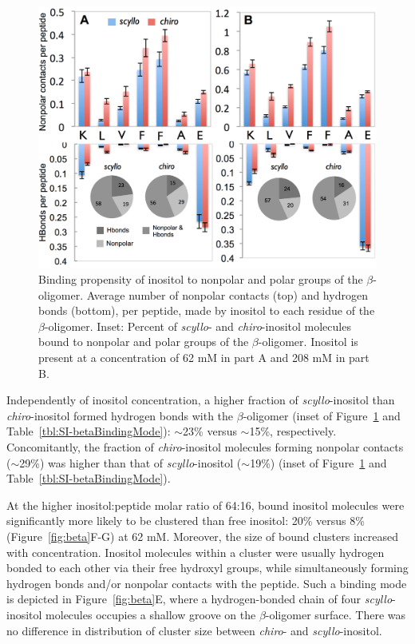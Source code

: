 \begin{figure}
\includegraphics[width=15cm]{figures/results2/inos2_figures_beta_residues_revised.pdf}
\caption[Binding propensity of inositol to nonpolar and polar groups of the $\beta$-oligomer]{Binding propensity of inositol to nonpolar and polar groups of the $\beta$-oligomer. Average number of nonpolar contacts (top) and hydrogen bonds (bottom), per peptide, made by inositol to each residue of the $\beta$-oligomer. Inset: Percent of \emph{scyllo}- and \emph{chiro}-inositol molecules bound to nonpolar and polar groups of the $\beta$-oligomer.  Inositol is present at a concentration of 62 mM in part A and 208 mM in part B.}
\label{fig:beta_residue_binding}
\end{figure}

Independently of inositol concentration, a higher fraction of \emph{scyllo}-inositol than \emph{chiro}-inositol formed hydrogen bonds with the $\beta$-oligomer (inset of Figure~\ref{fig:beta_residue_binding} and Table~\ref{tbl:SI-betaBindingMode}):  $\sim$23\% versus $\sim$15\%, respectively. Concomitantly, the fraction of \emph{chiro}-inositol molecules forming nonpolar contacts ($\sim$29\%) was higher than that of \emph{scyllo}-inositol ($\sim$19\%) (inset of Figure~\ref{fig:beta_residue_binding} and Table~\ref{tbl:SI-betaBindingMode}).

At the higher inositol:peptide molar ratio of 64:16, bound inositol molecules were significantly more likely to be clustered than free inositol: 20\% versus 8\% (Figure~{\ref{fig:beta}}F-G) at 62 mM. Moreover, the size of bound clusters increased with concentration. Inositol molecules within a cluster were usually hydrogen bonded 
to each other via their free hydroxyl groups, while simultaneously forming hydrogen bonds and/or nonpolar contacts with the peptide.  Such a binding mode is depicted in Figure~{\ref{fig:beta}}E, where a hydrogen-bonded chain of four  \emph{scyllo}-inositol molecules occupies a shallow groove on the $\beta$-oligomer surface. %
There was no difference in distribution of cluster size between \emph{chiro}- and \emph{scyllo}-inositol.


